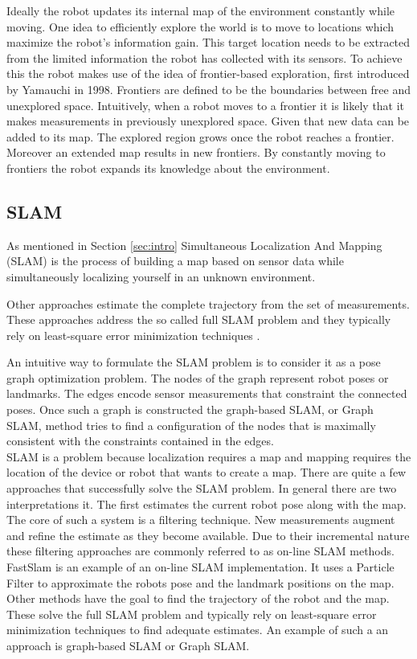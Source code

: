 \documentclass{ba-kecs}
\begin{document}
Ideally the robot updates its internal map of the environment constantly while moving. One idea to efficiently explore the world is to move to locations which maximize the robot's information gain. This target location needs to be extracted from the limited information the robot has collected with its sensors.
To achieve this the robot makes use of the idea of frontier-based exploration, first introduced by Yamauchi \cite{Yamauchi} in 1998. Frontiers are defined to be the boundaries between free and unexplored space. Intuitively, when a robot moves to a frontier it is likely that it makes measurements in previously unexplored space. Given that new data can be added to its map. The explored region grows once the robot reaches a frontier. Moreover an extended map results in new frontiers. By constantly moving to frontiers the robot expands its knowledge about the environment.

\subsection{SLAM}
\label{subsec:sotaSlam}
As mentioned in Section \ref{sec:intro} Simultaneous Localization And Mapping (SLAM) is the process of building a map based on sensor data while simultaneously localizing yourself in an unknown environment.

Other approaches estimate the complete trajectory from the set of measurements. These approaches address the so called full SLAM problem and they typically rely on least-square error minimization techniques \cite{Leastsquares}.

An intuitive way to formulate the SLAM problem is to consider it as a pose graph optimization problem. The nodes of the graph represent robot poses or landmarks. The edges encode sensor measurements that constraint the connected poses. Once such a graph is constructed the graph-based SLAM, or Graph SLAM, method tries to find a configuration of the nodes that is maximally consistent with the constraints contained in the edges.\\

SLAM is a problem because localization requires a map and mapping requires the location of the device or robot that wants to create a map. There are quite a few approaches that successfully solve the SLAM problem. 
In general there are two interpretations it. The first estimates the current robot pose along with the map. The core of such a system is a filtering technique. New measurements augment and refine the estimate as they become available. Due to their incremental nature these filtering approaches are commonly referred to as on-line SLAM methods. FastSlam \citep{Montemerlo02} is an example of an on-line SLAM implementation. It uses a Particle Filter to approximate the robots pose and the landmark positions on the map. Other methods have the goal to find the trajectory of the robot and the map. These solve the full SLAM problem and typically rely on least-square error minimization techniques \cite{Leastsquares} to find adequate estimates.  
An example of such a an approach is graph-based SLAM or Graph SLAM.
\end{document}
